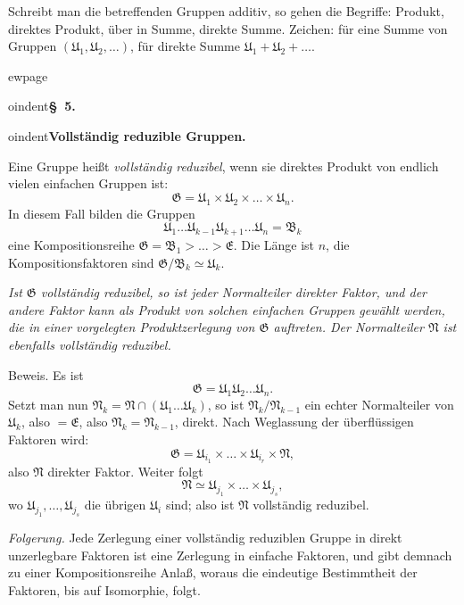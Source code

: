 \documentclass[12pt,a4paper]{article}
\newcommand{\dprod}{\times}             %
\theoremstyle{definition}
\begin{document}
Schreibt man die betreffenden Gruppen additiv, so gehen die Begriffe:
Produkt, direktes Produkt, \"uber in Summe, direkte Summe. Zeichen: f\"ur
eine Summe von Gruppen $(\mathfrak{U}_1, \mathfrak{U}_2, \dots)$, f\"ur
direkte Summe $\mathfrak{U}_1 + \mathfrak{U}_2 + \dots$.



ewpage
\setcounter{page}{589}



oindent\textbf{\S~5.}



oindent\textbf{Vollst\"andig reduzible Gruppen.}

Eine Gruppe hei\ss t \textit{vollst\"andig reduzibel}, wenn sie direktes
Produkt von endlich vielen einfachen Gruppen ist:
\[
\mathfrak{G} = \mathfrak{U}_1 \dprod \mathfrak{U}_2 \dprod \dots
\dprod \mathfrak{U}_n.
\]
In diesem Fall bilden die Gruppen
\[
\mathfrak{U}_1 \dots \mathfrak{U}_{k-1} \mathfrak{U}_{k+1} \dots
\mathfrak{U}_n = \mathfrak{B}_k
\]
eine Kompositionsreihe $\mathfrak{G} = \mathfrak{B}_1 > \dots >
\mathfrak{E}$. Die L\"ange ist $n$, die Kompositionsfaktoren sind
$\mathfrak{G}/\mathfrak{B}_k \simeq \mathfrak{U}_k$.

\textit{Ist $\mathfrak{G}$ vollst\"andig reduzibel, so ist jeder
Normalteiler direkter Faktor, und der andere Faktor kann als Produkt von
solchen einfachen Gruppen gew\"ahlt werden, die in einer vorgelegten
Produktzerlegung von $\mathfrak{G}$ auftreten. Der Normalteiler
$\mathfrak{N}$ ist ebenfalls vollst\"andig reduzibel.}

Beweis. Es ist
\[
\mathfrak{G} = \mathfrak{U}_1 \mathfrak{U}_2 \dots \mathfrak{U}_n.
\]
Setzt man nun $\mathfrak{N}_k = \mathfrak{N} \cap (\mathfrak{U}_1 \dots
\mathfrak{U}_k)$, so ist $\mathfrak{N}_k/\mathfrak{N}_{k-1}$
ein echter Normalteiler von $\mathfrak{U}_k$, also $= \mathfrak{E}$,
also $\mathfrak{N}_k = \mathfrak{N}_{k-1}$, direkt. Nach Weglassung der
\"uberfl\"ussigen Faktoren wird:
\[
\mathfrak{G} = \mathfrak{U}_{i_1} \dprod \dots \dprod
\mathfrak{U}_{i_r} \dprod \mathfrak{N},
\]
also $\mathfrak{N}$ direkter Faktor. Weiter folgt
\[
\mathfrak{N} \simeq \mathfrak{U}_{j_1} \dprod \dots \dprod
\mathfrak{U}_{j_s},
\]
wo $\mathfrak{U}_{j_1}, \dots, \mathfrak{U}_{j_s}$ die \"ubrigen
$\mathfrak{U}_i$ sind; also ist $\mathfrak{N}$ vollst\"andig reduzibel.

\textit{Folgerung.} Jede Zerlegung einer vollst\"andig reduziblen Gruppe
in direkt unzerlegbare Faktoren ist eine Zerlegung in einfache Faktoren,
und gibt demnach zu einer Kompositionsreihe Anla\ss, woraus die
eindeutige Bestimmtheit der Faktoren, bis auf Isomorphie, folgt.
\end{document}
